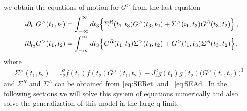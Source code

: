 \documentclass[prx,aps,onecolumn,amsfonts,showpacs,superscriptaddress,preprint,eqsecnum]
{revtex4-1}
\begin{document}
we obtain the equations of motion for $G^>$ from 
the last equation
\begin{align}
	i \partial_{t_1} G^>(t_1, t_2) &= \int_{-\infty}^\infty dt_3 \Bigl\{\Sigma^R(t_1, t_3) 
G^>(t_3, t_2) + \Sigma^>(t_1, t_3) G^A(t_3, t_2)\Bigr\} \, , \label{eq:kadanoffbaym1} \\
	-i \partial_{t_{2}} G^>(t_1, t_2) &= \int_{-\infty}^\infty dt_3 \Bigl\{G^R(t_1, t_3) 
\Sigma^>(t_3, t_2) + G^>(t_1, t_3) \Sigma^A(t_3, t_2)\Bigr\}, \label{eq:kadanoffbaym2}
\end{align}
where
\begin{gather}
	\Sigma^>(t_1, t_2) = J_2^2 f(t_1) f(t_2) G^>(t_1, t_2) - J_4^2 g(t_1) g(t_2) \bigl(G^>(t_1, 
t_2)\bigr)^3 
\label{eq:selfenergies}
\end{gather}
and $\Sigma^{R}$ and $\Sigma^{A}$ can be obtained from~\eqref{eq:SERet} and ~\eqref{eq:SEAd}. In the following sections we will solve this system of equations numerically and
also solve the generalization of this model in the large q-limit.
\end{document}
